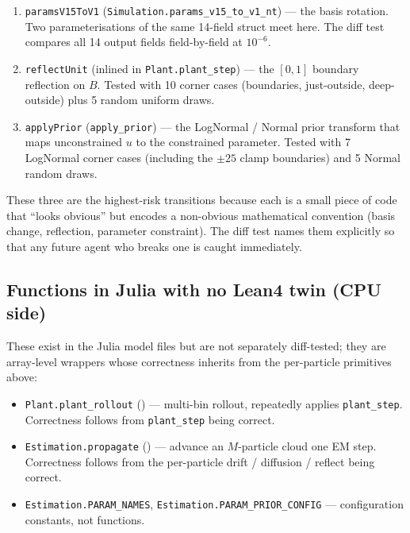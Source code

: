\documentclass[11pt,a4paper]{article}
\begin{document}
\begin{enumerate}[itemsep=2pt]
  \item \texttt{paramsV15ToV1} (\texttt{Simulation.params\_v15\_to\_v1\_nt})
        --- the basis rotation. Two parameterisations of the same
        14-field struct meet here. The diff test compares all 14
        output fields field-by-field at $10^{-6}$.
  \item \texttt{reflectUnit} (inlined in \texttt{Plant.plant\_step})
        --- the $[0, 1]$ boundary reflection on $B$. Tested with 10
        corner cases (boundaries, just-outside, deep-outside) plus 5
        random uniform draws.
  \item \texttt{applyPrior} (\texttt{apply\_prior}) --- the LogNormal /
        Normal prior transform that maps unconstrained $u$ to the
        constrained parameter. Tested with 7 LogNormal corner cases
        (including the $\pm 25$ clamp boundaries) and 5 Normal random
        draws.
\end{enumerate}

These three are the highest-risk transitions because each is a
small piece of code that ``looks obvious'' but encodes a non-obvious
mathematical convention (basis change, reflection, parameter
constraint). The diff test names them explicitly so that any future
agent who breaks one is caught immediately.

\subsection{Functions in Julia with no Lean4 twin (CPU side)}

These exist in the Julia model files but are not separately
diff-tested; they are array-level wrappers whose correctness inherits
from the per-particle primitives above:

\begin{itemize}[itemsep=2pt]
  \item \texttt{Plant.plant\_rollout} () --- multi-bin
        rollout, repeatedly applies \texttt{plant\_step}. Correctness
        follows from \texttt{plant\_step} being correct.
  \item \texttt{Estimation.propagate} () ---
        advance an $M$-particle cloud one EM step. Correctness follows
        from the per-particle drift / diffusion / reflect being
        correct.
  \item \texttt{Estimation.PARAM\_NAMES},
        \texttt{Estimation.PARAM\_PRIOR\_CONFIG} ---
        configuration constants, not functions.
\end{itemize}
\end{document}
